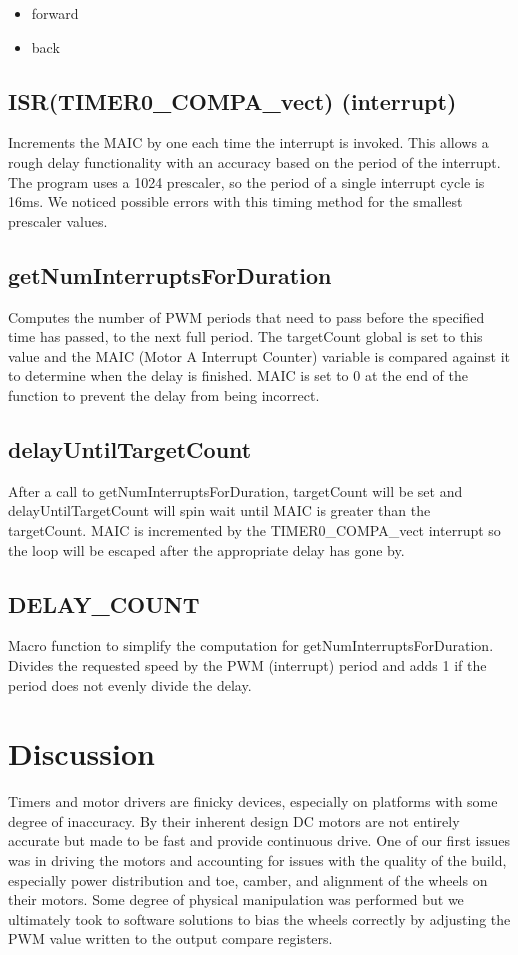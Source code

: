\documentclass[letterpaper,11pt]{texMemo} %
\begin{document}
\begin{itemize}
    \item forward
    \item back
\end{itemize}

\subsection*{ISR(TIMER0\_COMPA\_vect) (interrupt)}
Increments the MAIC by one each time the interrupt is invoked. This allows a rough delay functionality with an accuracy based on the period of the interrupt. The program uses a 1024 prescaler, so the period of a single interrupt cycle is 16ms. We noticed possible errors with this timing method for the smallest prescaler values.

\subsection*{getNumInterruptsForDuration}
Computes the number of PWM periods that need to pass before the specified time has passed, to the next full period. The targetCount global is set to this value and the MAIC (Motor A Interrupt Counter) variable is compared against it to determine when the delay is finished. MAIC is set to 0 at the end of the function to prevent the delay from being incorrect.

\subsection*{delayUntilTargetCount}
After a call to getNumInterruptsForDuration, targetCount will be set and delayUntilTargetCount will spin wait until MAIC is greater than the targetCount. MAIC is incremented by the TIMER0\_COMPA\_vect interrupt so the loop will be escaped after the appropriate delay has gone by.

\subsection*{DELAY\_COUNT}
Macro function to simplify the computation for getNumInterruptsForDuration. Divides the requested speed by the PWM (interrupt) period and adds 1 if the period does not evenly divide the delay.

\section*{Discussion}
Timers and motor drivers are finicky devices, especially on platforms with 
some degree of inaccuracy. By their inherent design DC motors are not entirely 
accurate but made to be fast and provide continuous drive. One of our first 
issues was in driving the motors and accounting for issues with the quality 
of the build, especially power distribution and toe, camber, and alignment of 
the wheels on their motors. Some degree of physical manipulation was performed 
but we ultimately took to software solutions to bias the wheels correctly by 
adjusting the PWM value written to the output compare registers.
\end{document}
